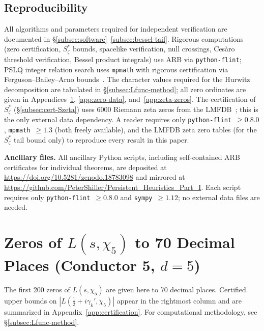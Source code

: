 \documentclass[12pt,reqno]{amsart}
\theoremstyle{plain}
\theoremstyle{definition}
\theoremstyle{remark}
\begin{document}
\subsection{Reproducibility}

All algorithms and parameters required for independent verification are documented in \S\ref{subsec:software}--\ref{subsec:bessel-tail}.  Rigorous computations (zero certification, $S_\zeta^*$ bounds, spacelike verification, null crossings, Ces\`aro threshold verification, Bessel product integrals) use ARB via \texttt{python-flint}; PSLQ integer relation search uses \texttt{mpmath} with rigorous certification via Ferguson--Bailey--Arno bounds~\cite{FBA1999}.  The character values required for the Hurwitz decomposition are tabulated in \S\ref{subsec:Lfunc-method}; all zero ordinates are given in Appendices~\ref{app:chi5-highprec}, \ref{app:zero-data}, and~\ref{app:zeta-zeros}.  The certification of $S_\zeta^*$ (\S\ref{subsec:cert-Szeta}) uses 6000 Riemann zeta zeros from the LMFDB~\cite{LMFDB}; this is the only external data dependency.  A reader requires only \texttt{python-flint}~$\geq 0.8.0$, \texttt{mpmath}~$\geq 1.3$ (both freely available), and the LMFDB zeta zero tables (for the $S_\zeta^*$ tail bound only) to reproduce every result in this paper.

\medskip\noindent\textbf{Ancillary files.}  All ancillary Python scripts, including self-contained ARB certificates for individual theorems, are deposited at \url{https://doi.org/10.5281/zenodo.18783098} and mirrored at \url{https://github.com/PeterShiller/Persistent\_Heuristics\_Part\_I}.  Each script requires only \texttt{python-flint}~$\geq 0.8.0$ and \texttt{sympy}~$\geq 1.12$; no external data files are needed.


\section{Zeros of \texorpdfstring{$L(s,\chi_5)$}{L(s,chi5)} to 70 Decimal Places (Conductor 5, \texorpdfstring{$d = 5$}{d=5})}\label{app:chi5-highprec}

The first 200 zeros of $L(s,\chi_5)$ are given here to 70 decimal places.  Certified upper bounds on $|L(\tfrac{1}{2}+i\gamma_k',\chi_5)|$ appear in the rightmost column and are summarized in Appendix~\ref{app:certification}.  For computational methodology, see \S\ref{subsec:Lfunc-method}.
\end{document}
